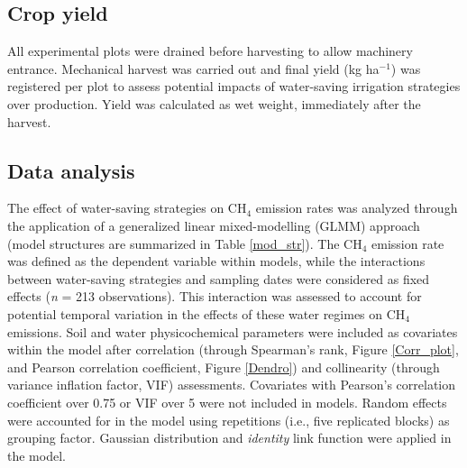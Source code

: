 \subsection{Crop yield}
\label{sec:meth_Yield}

All experimental plots were drained before harvesting to allow machinery entrance. Mechanical harvest was carried out and final yield (kg ha$^{-1}$) was registered per plot to assess potential impacts of water-saving irrigation strategies over production. Yield was calculated as wet weight, immediately after the harvest.  

\subsection{Data analysis}
\label{sec:meth_Stat}

The effect of water-saving strategies on CH$_{4}$ emission rates was analyzed through the application of a generalized linear mixed-modelling (GLMM) approach (model structures are summarized in Table \ref{mod_str}). The CH$_{4}$ emission rate was defined as the dependent variable within models, while the interactions between water-saving strategies and sampling dates were considered as fixed effects (\textit{n} = 213 observations). This interaction was assessed to account for potential temporal variation in the effects of these water regimes on CH$_{4}$ emissions. Soil and water physicochemical parameters were included as covariates within the model after correlation (through Spearman's rank, Figure \ref{Corr_plot}, and Pearson correlation coefficient, Figure \ref{Dendro}) and collinearity (through variance inflation factor, VIF) assessments. Covariates with Pearson's correlation coefficient over 0.75 or VIF over 5 were not included in models. Random effects were accounted for in the model using repetitions (i.e., five replicated blocks) as grouping factor. Gaussian distribution and \textit{identity} link function were applied in the model.\\


